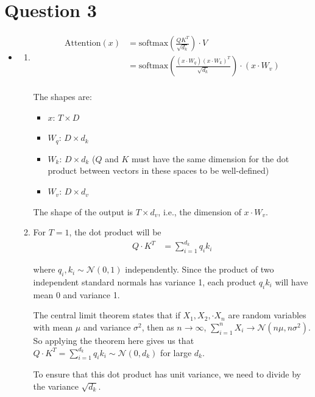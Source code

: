 \documentclass{article}
\newcounter{theorem}[section]
\begin{document}
\newpage
\section*{Question 3}
\begin{itemize}
    \item[(a)] \begin{enumerate}
        \item \begin{align*}
            \text{Attention}(x) &= \text{softmax} \left( \frac{Q K^T}{\sqrt{d_k}} \right) \cdot V\\
             &= \text{softmax} \left( \frac{(x \cdot W_q) (x \cdot W_k)^T}{\sqrt{d_k}} \right) \cdot (x \cdot W_v)\\
        \end{align*}
        
        The shapes are:
        \begin{itemize}
            \item $x$: $T \times D$
            \item $W_q$: $D \times d_k$
            \item $W_k$: $D \times d_k$ ($Q$ and $K$ must have the same dimension for the dot product between vectors in these spaces to be well-defined)
            \item $W_v$: $D \times d_v$
        \end{itemize}
        The shape of the output is $T \times d_v$, i.e., the dimension of $x \cdot W_v$. 

        \item For $T = 1$, the dot product will be
        \begin{align*}
            Q \cdot K^T &= \sum_{i=1}^{d_k} q_i k_i
        \end{align*}

        where $q_i, k_i \sim \mathcal{N}(0, 1)$ independently. Since the product of two independent standard normals has variance 1, each product $q_i k_i$ will have mean 0 and variance 1.

        The central limit theorem states that if $X_1, X_2, \cdot X_n$ are random variables with mean $\mu$ and variance $\sigma^2$, then as $n \to \infty$, $\sum_{i=1}^n X_i \rightarrow \mathcal{N}(n \mu, n \sigma^2)$. So applying the theorem here gives us that $Q \cdot K^T = \sum\limits_{i=1}^{d_k} q_i k_i \sim \mathcal{N}(0, d_k)$ for large $d_k$. 

        To ensure that this dot product has unit variance, we need to divide by the variance $\sqrt{d_k}$. 


\end{enumerate}
\end{itemize}
\end{document}
